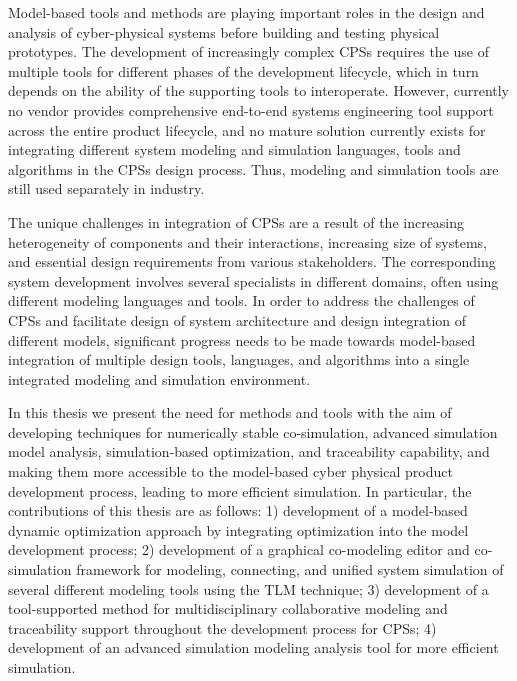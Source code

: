 
Model-based tools and methods are playing important roles in the design and analysis of cyber-physical systems before building and testing physical prototypes. The development of increasingly complex CPSs requires the use of multiple tools for different phases of the development lifecycle, which in turn depends on the ability of the supporting tools to interoperate. However, currently no vendor provides comprehensive end-to-end systems engineering tool support across the entire product lifecycle, and no mature solution currently exists for integrating different system modeling and simulation languages, tools and algorithms in the CPSs design process. Thus, modeling and simulation tools are still used separately in industry.

The unique challenges in integration of CPSs are a result of the increasing heterogeneity of components and their interactions, increasing size of systems, and essential design requirements from various stakeholders. The corresponding system development involves several specialists in different domains, often using different modeling languages and tools. In order to address the challenges of CPSs and facilitate design of system architecture and design integration of different models, significant progress needs to be made towards model-based integration of multiple design tools, languages, and algorithms into a single integrated modeling and simulation environment. 

In this thesis we present the need for methods and tools with the aim of developing techniques for numerically stable co-simulation, advanced simulation model analysis, simulation-based optimization, and traceability capability, and making them more accessible to the model-based cyber physical product development process, leading to more efficient simulation. In particular, the contributions of this thesis are as follows: 1) development of a model-based dynamic optimization approach by integrating optimization into the model development process; 2) development of a graphical co-modeling editor and co-simulation framework for modeling, connecting, and unified system simulation of several different modeling tools using the TLM technique; 3) development of a tool-supported method for multidisciplinary collaborative modeling and traceability support throughout the development process for CPSs; 4) development of an advanced simulation modeling analysis tool for more efficient simulation.




